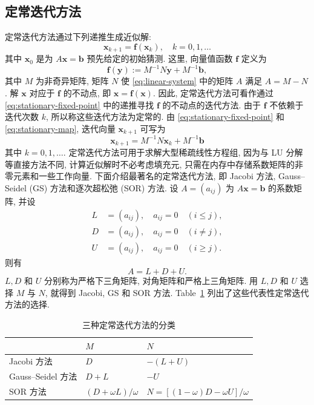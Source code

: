 \subsection{{定常迭代方法}}\label{sec:stationary-iterations}
{定常迭代方法通过下列递推生成近似解:}
\begin{equation}\label{eq:stationary-fixed-point}
\bm x_{k+1}=\bm f(\bm x_k),\quad k=0,1,\ldots
\end{equation}
{其中 $\bm x_0$ 是为 $A\bm x=\bm b$ 预先给定的初始猜测. 这里, 向量值函数 $\bm f$ 定义为}
\begin{equation}\label{eq:stationary-map}
\bm f(\bm y):=M^{-1}N\bm y+M^{-1}\bm b,
\end{equation}
{其中 $M$ 为非奇异矩阵, 矩阵 $N$ 使 \eqref{eq:linear-system} 中的矩阵 $A$ 满足 $A=M-N$. 解 $\bm x$ 对应于 $\bm f$ 的不动点, 即 $\bm x=\bm f(\bm x)$. 因此, 定常迭代方法可看作通过 \eqref{eq:stationary-fixed-point} 中的递推寻找 $\bm f$ 的不动点的迭代方法. 由于 $\bm f$ 不依赖于迭代次数 $k$, 所以称这些迭代方法为定常的. 由 \eqref{eq:stationary-fixed-point} 和 \eqref{eq:stationary-map}, 迭代向量 $\bm x_{k+1}$ 可写为}
\begin{equation}\label{eq:stationary-splitting-iteration}
\bm x_{k+1}=M^{-1}N\bm x_k+M^{-1}\bm b
\end{equation}
{其中 $k=0,1,\ldots$.}
{定常迭代方法可用于求解大型稀疏线性方程组, 因为与 LU 分解等直接方法不同, 计算近似解时不必考虑填充元, 只需在内存中存储系数矩阵的非零元素和一些工作向量.}
{下面介绍最著名的定常迭代方法, 即 Jacobi 方法, Gauss--Seidel (GS) 方法和逐次超松弛 (SOR) 方法. 设 $A=(a_{ij})$ 为 $A\bm x=\bm b$ 的系数矩阵, 并设}
\[
\begin{aligned}
L&=(a_{ij}),\quad a_{ij}=0\quad(i\le j),\\
D&=(a_{ij}),\quad a_{ij}=0\quad(i\ne j),\\
U&=(a_{ij}),\quad a_{ij}=0\quad(i\ge j).
\end{aligned}
\]
{则有}
\[A=L+D+U.\]
{$L,D$ 和 $U$ 分别称为严格下三角矩阵, 对角矩阵和严格上三角矩阵.}
{用 $L,D$ 和 $U$ 选择 $M$ 与 $N$, 就得到 Jacobi, GS 和 SOR 方法. Table~\ref{tab:stationary-splittings} 列出了这些代表性定常迭代方法的选择.}
\begin{table}[H]\centering
\caption{{三种定常迭代方法的分类}}\label{tab:stationary-splittings}
\begin{tabular}{lll}\hline
& $M$ & $N$\\\hline
Jacobi {方法} & $D$ & $-(L+U)$\\
Gauss--Seidel {方法} & $D+L$ & $-U$\\
SOR {方法} & $(D+\omega L)/\omega$ & $N=[(1-\omega)D-\omega U]/\omega$\\\hline
\end{tabular}\end{table}

